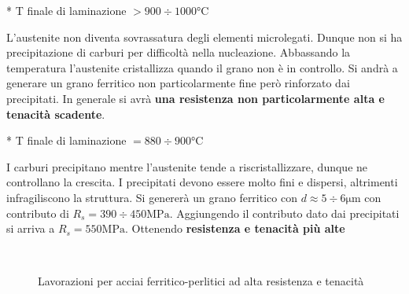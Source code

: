 \setlength{\columnsep}{35pt}
\begin{multicols}{2}
\begin{definition}{}{*}
T finale di laminazione $> 900 \div 1000\unit{\celsius}$
\end{definition}
L'austenite non diventa sovrassatura degli elementi microlegati.
Dunque non si ha precipitazione di carburi per difficoltà nella
nucleazione. Abbassando la temperatura l'austenite cristallizza quando
il grano non è in controllo. Si andrà a generare un grano ferritico non 
particolarmente fine però rinforzato dai precipitati.
In generale si avrà \textbf{una resistenza non particolarmente alta e
tenacità scadente}.
\columnbreak
\begin{definition}{}{*}
T finale di laminazione $= 880 \div 900\unit{\celsius}$
\end{definition}
I carburi precipitano mentre l'austenite tende a riscristallizzare, dunque
ne controllano la crescita.
I precipitati devono essere molto fini e dispersi, altrimenti 
infragiliscono la struttura.
Si genererà un grano ferritico con $d \approx 5 \div 6\unit{\um}$ con 
contributo di $R_s = 390\div450\unit{\MPa}$.
Aggiungendo il contributo dato dai precipitati si arriva a $R_s = 
550\unit{\MPa}$. Ottenendo \textbf{resistenza e tenacità più alte}
\end{multicols}

\begin{figure}
\centering
{}\\
\caption{Lavorazioni per acciai ferritico-perlitici ad alta resistenza e tenacità}
\label{fig:LavHSHT}
\end{figure}

